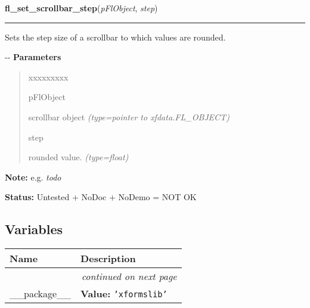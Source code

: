 \hspace{.8\funcindent}\begin{boxedminipage}{\funcwidth}

    \raggedright \textbf{fl\_set\_scrollbar\_step}(\textit{pFlObject}, \textit{step})

    \vspace{-1.5ex}

    \rule{\textwidth}{0.5\fboxrule}
\setlength{\parskip}{2ex}

Sets the step size of a scrollbar to which values are rounded.

-{}-
\setlength{\parskip}{1ex}
      \textbf{Parameters}
      \vspace{-1ex}

      \begin{quote}
        \begin{Ventry}{xxxxxxxxx}

          \item[pFlObject]


scrollbar object
            {\it (type=pointer to xfdata.FL\_OBJECT)}

          \item[step]


rounded value.
            {\it (type=float)}

        \end{Ventry}

      \end{quote}

\textbf{Note:} 
e.g. \emph{todo}


\textbf{Status:} 
Untested + NoDoc + NoDemo = NOT OK


    \end{boxedminipage}



  \subsection{Variables}

    \vspace{-1cm}
\hspace{\varindent}\begin{longtable}{|p{\varnamewidth}|p{\vardescrwidth}|l}
\cline{1-2}
\cline{1-2} \centering \textbf{Name} & \centering \textbf{Description}& \\
\cline{1-2}
\endhead\cline{1-2}\multicolumn{3}{r}{\small\textit{continued on next page}}\\\endfoot\cline{1-2}
\endlastfoot\raggedright \_\-\_\-p\-a\-c\-k\-a\-g\-e\-\_\-\_\- & \raggedright \textbf{Value:} 
{\tt \texttt{'}\texttt{xformslib}\texttt{'}}&\\
\cline{1-2}
\end{longtable}

